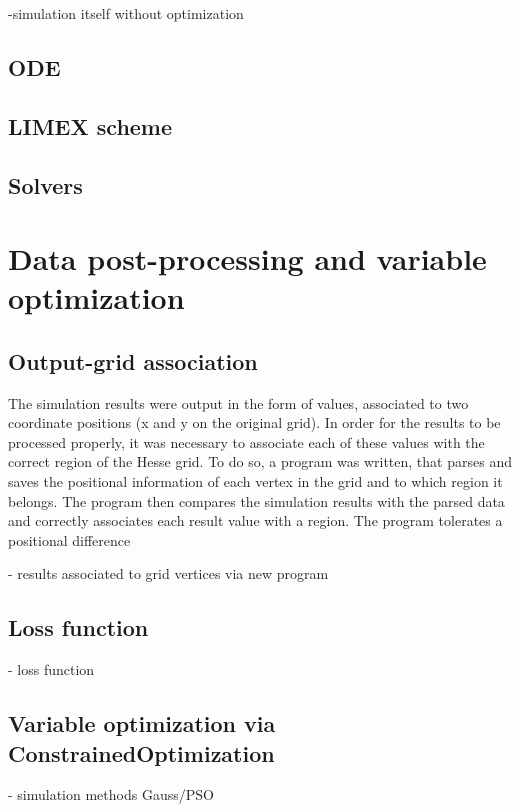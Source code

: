-simulation itself without optimization

\subsection{ODE}


\subsection{LIMEX scheme}


\subsection{Solvers}


\section{Data post-processing and variable optimization}

\subsection{Output-grid association}
The simulation results were output in the form of values, associated to two coordinate positions (x and y on the
original grid). In order for the results to be processed properly, it was necessary to associate each of these
values with the correct region of the Hesse grid. To do so, a program was written, that parses and saves the positional
information of each vertex in the grid and to which region it belongs. The program then compares the simulation results
with the parsed data and correctly associates each result value with a region. The program tolerates a positional difference


- results associated to grid vertices via new program

\subsection{Loss function}
- loss function\\

\subsection{Variable optimization via ConstrainedOptimization}
- simulation methods Gauss/PSO
